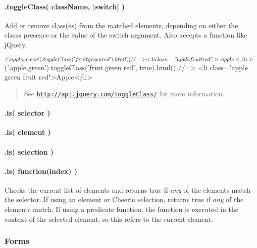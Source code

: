 \paragraph*{.toggle\+Class( class\+Name, \mbox{[}switch\mbox{]} )}

Add or remove class(es) from the matched elements, depending on either the class\textquotesingle{}s presence or the value of the switch argument. Also accepts a {\ttfamily function} like j\+Query.


\begin{DoxyCode}
$('.apple.green').toggleClass('fruit green red').html()
//=> <li class="apple fruit red">Apple</li>

$('.apple.green').toggleClass('fruit green red', true).html()
//=> <li class="apple green fruit red">Apple</li>
\end{DoxyCode}


\begin{quote}
See \href{http://api.jquery.com/toggleClass/}{\tt http\+://api.\+jquery.\+com/toggle\+Class/} for more information. \end{quote}


\paragraph*{.is( selector )}

\paragraph*{.is( element )}

\paragraph*{.is( selection )}

\paragraph*{.is( function(index) )}

Checks the current list of elements and returns {\ttfamily true} if {\itshape any} of the elements match the selector. If using an element or Cheerio selection, returns {\ttfamily true} if {\itshape any} of the elements match. If using a predicate function, the function is executed in the context of the selected element, so {\ttfamily this} refers to the current element.

\subsubsection*{Forms}


